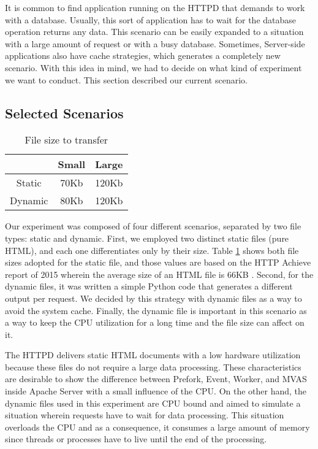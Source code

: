 It is common to find application running on the HTTPD that demands to work with
a database. Usually, this sort of application has to wait for the database
operation returns any data. This scenario can be easily expanded to a situation
with a large amount of request or with a busy database. Sometimes, Server-side
applications also have cache strategies, which generates a completely new
scenario. With this idea in mind, we had to decide on what kind of experiment
we want to conduct. This section described our current scenario. 

\subsection{Selected Scenarios}
\label{sec:scenarios}

\begin{table}[!h]
  \centering
  \begin{tabular}{|c|c|c|}
    \hline
    & \textbf{Small} & \textbf{Large}\\
    \hline
    Static & 70Kb & 120Kb\\
    \hline
    Dynamic & 80Kb & 120Kb \\
    \hline
  \end{tabular}
  \caption{File size to transfer}
  \label{tab:file_size}
\end{table}

Our experiment was composed of four different scenarios, separated by two file
types: static and dynamic. First, we employed two distinct static files (pure
HTML), and each one differentiates only by their size. Table
\ref{tab:file_size} shows both file sizes adopted for the static file, and
those values are based on the HTTP Achieve report of 2015 wherein the average
size of an HTML file is 66KB \cite{httparchive}.  Second, for the dynamic
files, it was written a simple Python code that generates a different output
per request. We decided by this strategy with dynamic files as a way to avoid
the system cache.  Finally, the dynamic file is important in this scenario as a
way to keep the CPU utilization for a long time and the file size can affect on
it.

The HTTPD delivers static HTML documents with a low hardware utilization
because these files do not require a large data processing. These
characteristics are desirable to show the difference between Prefork, Event,
Worker, and MVAS inside Apache Server with a small influence of the CPU. On the
other hand, the dynamic files used in this experiment are CPU bound and aimed
to simulate a situation wherein requests have to wait for data processing. This
situation overloads the CPU and as a consequence, it consumes a large amount of
memory since threads or processes have to live until the end of the processing.

